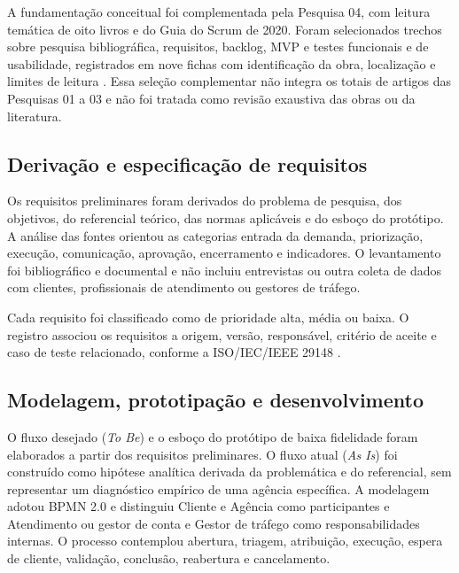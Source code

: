 A fundamentação conceitual foi complementada pela Pesquisa 04, com leitura temática de oito livros e do Guia do Scrum de 2020. Foram selecionados trechos sobre pesquisa bibliográfica, requisitos, backlog, MVP e testes funcionais e de usabilidade, registrados em nove fichas com identificação da obra, localização e limites de leitura \cite{GIL_1991,BOOTH_COLOMB_WILLIAMS_2008,SOMMERVILLE_2011,SCHWABER_SUTHERLAND_2020,AUDY_2015,CAROLI_2015,MYERS_SANDLER_BADGETT_2012,PRESSMAN_MAXIM_2021,TEIXEIRA_2014}. Essa seleção complementar não integra os totais de artigos das Pesquisas 01 a 03 e não foi tratada como revisão exaustiva das obras ou da literatura.

\subsection{\esp Derivação e especificação de requisitos}

Os requisitos preliminares foram derivados do problema de pesquisa, dos objetivos, do referencial teórico, das normas aplicáveis e do esboço do protótipo. A análise das fontes orientou as categorias entrada da demanda, priorização, execução, comunicação, aprovação, encerramento e indicadores. O levantamento foi bibliográfico e documental e não incluiu entrevistas ou outra coleta de dados com clientes, profissionais de atendimento ou gestores de tráfego.

Cada requisito foi classificado como de prioridade alta, média ou baixa. O registro associou os requisitos a origem, versão, responsável, critério de aceite e caso de teste relacionado, conforme a ISO/IEC/IEEE 29148 \cite{iso29148}.

\subsection{\esp Modelagem, prototipação e desenvolvimento}

O fluxo desejado (\textit{To Be}) e o esboço do protótipo de baixa fidelidade foram elaborados a partir dos requisitos preliminares. O fluxo atual (\textit{As Is}) foi construído como hipótese analítica derivada da problemática e do referencial, sem representar um diagnóstico empírico de uma agência específica. A modelagem adotou BPMN 2.0 \cite{omg2011} e distinguiu Cliente e Agência como participantes e Atendimento ou gestor de conta e Gestor de tráfego como responsabilidades internas. O processo contemplou abertura, triagem, atribuição, execução, espera de cliente, validação, conclusão, reabertura e cancelamento.


